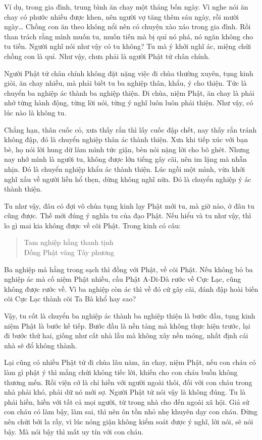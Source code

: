\documentclass[
  12pt,
  oneside]{book}
\begin{document}
Ví dụ, trong gia đình, trung bình ăn chay một tháng bốn ngày. Vì nghe nói ăn chay có phước nhiều được khen, nên người vợ tăng thêm sáu ngày, rồi mười ngày\ldots{} Chồng con ăn theo không nổi nên có chuyện xào xáo trong gia đình. Rồi than trách rằng mình muốn tu, muốn tiến mà bị quỉ nó phá, nó ngăn không cho tu tiến. Người nghĩ nói như vậy có tu không? Tu mà ý khởi nghĩ ác, miệng chửi chồng con là quỉ. Như vậy, chưa phải là người Phật tử chân chính.

Người Phật tử chân chính không đặt nặng việc đi chùa thường xuyên, tụng kinh giỏi, ăn chay nhiều, mà phải biết tu ba nghiệp thân, khẩu, ý cho thiện. Tức là chuyển ba nghiệp ác thành ba nghiệp thiện. Đi chùa, niệm Phật, ăn chay là phải nhớ từng hành động, từng lời nói, từng ý nghĩ luôn luôn phải thiện. Như vậy, có lúc nào là không tu.

Chẳng hạn, thân cuốc cỏ, xưa thấy rắn thì lấy cuốc đập chết, nay thấy rắn tránh không đập, đó là chuyển nghiệp thân ác thành thiện. Xưa khi tiếp xúc với bạn bè, họ nói lời hung dữ làm mình tức giận, bèn nói nặng lời cho bõ ghét. Nhưng nay nhớ mình là người tu, không được lớn tiếng gây cãi, nên im lặng mà nhẫn nhịn. Đó là chuyển nghiệp khẩu ác thành thiện. Lúc ngồi một mình, vừa khởi nghĩ xấu về người liền hổ thẹn, dừng không nghĩ nữa. Đó là chuyển nghiệp ý ác thành thiện.

Tu như vậy, đâu có đợi vô chùa tụng kinh lạy Phật mới tu, mà giờ nào, ở đâu tu cũng được. Thế mới đúng ý nghĩa tu của đạo Phật. Nếu hiểu và tu như vậy, thì lo gì mai kia không được về cõi Phật. Trong kinh có câu:

\begin{quote}
Tam nghiệp hằng thanh tịnh\\
Đồng Phật vãng Tây phương
\end{quote}

Ba nghiệp mà hằng trong sạch thì đồng với Phật, về cõi Phật. Nếu không bỏ ba nghiệp ác mà cố niệm Phật nhiều, cầu Phật A-Di-Dà rước về Cực Lạc, cũng không được rước về. Vì ba nghiệp còn ác thì về đó cứ gây cãi, đánh đập hoài biến cõi Cực Lạc thành cõi Ta Bà khổ hay sao?

Vậy, tu cốt là chuyển ba nghiệp ác thành ba nghiệp thiện là bước đầu, tụng kinh niệm Phật là bước kế tiếp. Bước đầu là nền tảng mà không thực hiện trước, lại đi bước thứ hai, giống như cất nhà lầu mà không xây nền móng, nhất định cái nhà sẽ đổ không thành.

Lại cũng có nhiều Phật tử đi chùa lâu năm, ăn chay, niệm Phật, nếu con cháu có làm gì phật ý thì mắng chửi không tiếc lời, khiến cho con cháu buồn không thương mến. Rồi viện cớ là chỉ hiền với người ngoài thôi, đối với con cháu trong nhà phải khó, phải dữ nó mới sợ. Người Phật tử nói vậy là không đúng. Tu là phải hiền, hiền với tất cả mọi người, từ trong nhà cho đến ngoài xã hội. Giả sử con cháu có làm bậy, làm sai, thì nên ôn tồn nhỏ nhẹ khuyên dạy con cháu. Đừng nên chửi bới la rầy, vì lúc nóng giận không kiểm soát được ý nghĩ, lời nói, sẽ nói bậy. Mà nói bậy thì mất uy tín với con cháu.
\end{document}
